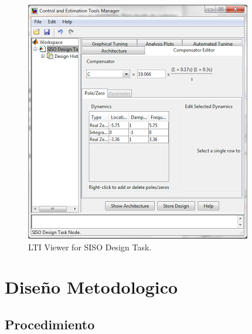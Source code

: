 \documentclass[a4paper,12pt,twoside]{proyectotanquesecci}
\begin{document}
\begin{figure}[h]
\centering
\includegraphics[scale=0.7]{Ventana18}
\renewcommand{\figurename}{Fig.}
\caption{LTI Viewer for SISO Design Task.}
\label{LTI Viewer for SISO Design Task.}
\end{figure}

\newpage






\chapter{Diseño Metodologico}





\section{Procedimiento}
\end{document}
